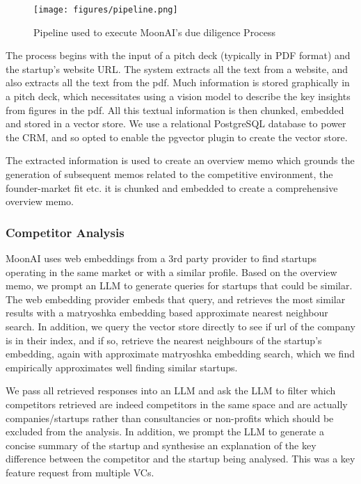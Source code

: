 \documentclass[a4paper, oneside]{discothesis}
\begin{document}
\begin{figure}[h]
    \centering
    \texttt{[image: figures/pipeline.png]}
    \caption{Pipeline used to execute MoonAI's due diligence Process}
    \label{fig:due_diligence_arch}
\end{figure}

The process begins with the input of a pitch deck (typically in PDF format) and the startup's website URL. The system extracts all the text from a website, and also extracts all the text from the pdf. Much information is stored graphically in a pitch deck, which necessitates using a vision model to describe the key insights from figures in the pdf. All this textual information is then chunked, embedded and stored in a vector store. We use a relational PostgreSQL database to power the CRM, and so opted to enable the pgvector plugin to create the vector store.

The extracted information is used to create an overview memo which grounds the generation of subsequent memos related to the competitive environment, the founder-market fit etc. it is chunked and embedded to create a comprehensive overview memo. 

\subsubsection{Competitor Analysis}
MoonAI uses web embeddings from a 3rd party provider to find startups operating in the same market or with a similar profile. Based on the overview memo, we prompt an LLM to generate queries for startups that could be similar. The web embedding provider embeds that query, and retrieves the most similar results with a matryoshka embedding based approximate nearest neighbour search. In addition, we query the vector store directly to see if url of the company is in their index, and if so, retrieve the nearest neighbours of the startup's embedding, again with approximate matryoshka embedding search, which we find empirically approximates well finding similar startups. 

We pass all retrieved responses into an LLM and ask the LLM to filter which competitors retrieved are indeed competitors in the same space and are actually companies/startups rather than consultancies or non-profits which should be excluded from the analysis. In addition, we prompt the LLM to generate a concise summary of the startup and synthesise an explanation of the key difference between the competitor and the startup being analysed. This was a key feature request from multiple VCs.
\end{document}
